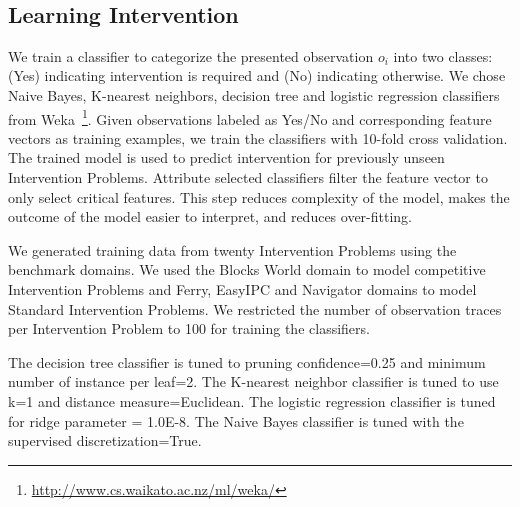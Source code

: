 ~\subsection{Learning Intervention}
\label{sec:learning-to-intervene}
We train a classifier to categorize the presented observation $o_i$ into two classes: (Yes) indicating intervention is required and (No) indicating otherwise. 
We chose Naive Bayes, K-nearest neighbors, decision tree and logistic regression classifiers from Weka~\footnote{\url{http://www.cs.waikato.ac.nz/ml/weka/}}. 
Given observations labeled as Yes/No and corresponding feature vectors as training examples, we train the classifiers with 10-fold cross validation. 
The trained model is used to predict intervention for previously unseen Intervention Problems. 
Attribute selected classifiers filter the feature vector to only select critical features. 
This step reduces complexity of the model, makes the outcome of the model easier to interpret, and reduces over-fitting. 

We generated training data from twenty Intervention Problems using the benchmark domains. We used the Blocks World domain to model competitive Intervention Problems and Ferry, EasyIPC and Navigator domains to model Standard Intervention Problems.
We restricted the number of observation traces per Intervention Problem to 100 for training the classifiers.
 
The decision tree classifier is tuned to pruning confidence=0.25 and minimum number of instance per leaf=2. 
The K-nearest neighbor classifier is tuned to use k=1 and distance measure=Euclidean. 
The logistic regression classifier is tuned for ridge parameter = 1.0E-8. 
The Naive Bayes classifier is tuned with the supervised discretization=True.



